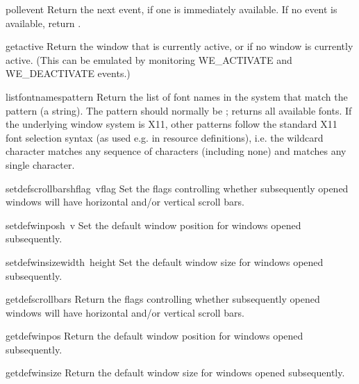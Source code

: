 \begin{funcdesc}{pollevent}{}
Return the next event, if one is immediately available.
If no event is available, return \code{()}.
\end{funcdesc}

\begin{funcdesc}{getactive}{}
Return the window that is currently active, or  if no
window is currently active.  (This can be emulated by monitoring
WE_ACTIVATE and WE_DEACTIVATE events.)
\end{funcdesc}

\begin{funcdesc}{listfontnames}{pattern}
Return the list of font names in the system that match the pattern (a
string).  The pattern should normally be ; returns all
available fonts.  If the underlying window system is X11, other
patterns follow the standard X11 font selection syntax (as used e.g.
in resource definitions), i.e. the wildcard character 
matches any sequence of characters (including none) and 
matches any single character.
\end{funcdesc}

\begin{funcdesc}{setdefscrollbars}{hflag\, vflag}
Set the flags controlling whether subsequently opened windows will
have horizontal and/or vertical scroll bars.
\end{funcdesc}

\begin{funcdesc}{setdefwinpos}{h\, v}
Set the default window position for windows opened subsequently.
\end{funcdesc}

\begin{funcdesc}{setdefwinsize}{width\, height}
Set the default window size for windows opened subsequently.
\end{funcdesc}

\begin{funcdesc}{getdefscrollbars}{}
Return the flags controlling whether subsequently opened windows will
have horizontal and/or vertical scroll bars.
\end{funcdesc}

\begin{funcdesc}{getdefwinpos}{}
Return the default window position for windows opened subsequently.
\end{funcdesc}

\begin{funcdesc}{getdefwinsize}{}
Return the default window size for windows opened subsequently.
\end{funcdesc}

